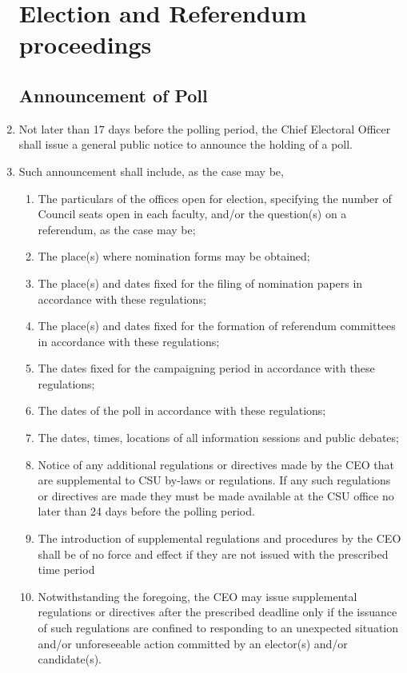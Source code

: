 \documentclass[oneside]{book}
\begin{document}
\begin{enumerate}
\chapter{\label{Election_and_Referendum_proceedings}Election and Referendum
proceedings }


\section{\label{Announcement_of_Poll}Announcement of Poll }
\item Not later than 17 days before the polling period, the Chief Electoral
Officer shall issue a general public notice to announce the holding
of a poll. 
\item Such announcement shall include, as the case may be, 

\begin{enumerate}
\item The particulars of the offices open for election, specifying the number
of Council seats open in each faculty, and/or the question(s) on a
referendum, as the case may be; 
\item The place(s) where nomination forms may be obtained; 
\item The place(s) and dates fixed for the filing of nomination papers in
accordance with these regulations; 
\item The place(s) and dates fixed for the formation of referendum committees
in accordance with these regulations; 
\item The dates fixed for the campaigning period in accordance with these
regulations; 
\item The dates of the poll in accordance with these regulations; 
\item The dates, times, locations of all information sessions and public
debates; 
\item Notice of any additional regulations or directives made by the CEO
that are supplemental to CSU by-laws or regulations. If any such regulations
or directives are made they must be made available at the CSU office
no later than 24 days before the polling period. 
\item The introduction of supplemental regulations and procedures by the
CEO shall be of no force and effect if they are not issued with the
prescribed time period 
\item Notwithstanding the foregoing, the CEO may issue supplemental regulations
or directives after the prescribed deadline only if the issuance of
such regulations are confined to responding to an unexpected situation
and/or unforeseeable action committed by an elector(s) and/or candidate(s). 
\end{enumerate}

\end{enumerate}
\end{document}
